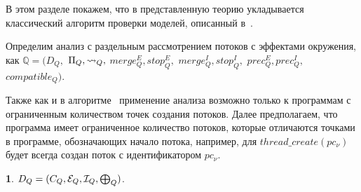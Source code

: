 В этом разделе покажем, что в представленную теорию укладывается классический алгоритм проверки моделей, описанный в~\cite{ThreadModular03}.

Определим анализ с раздельным рассмотрением потоков с эффектами окружения, как
$\mathbb{Q}=(D_{Q},$ $\Pi_{Q}, \leadsto_{Q},$ $merge^E_{Q}, stop^E_{Q},$ $merge^I_{Q}, stop^I_{Q},$ $prec^E_{Q},prec^I_{Q},$ $compatible_{Q})$.

Также как и в алгоритме~\cite{ThreadModular03} применение анализа возможно только к программам с ограниченным количеством точек создания потоков. Далее предполагаем, что программа имеет ограниченное количество потоков, которые отличаются точками в программе, обозначающих начало потока, например, для $thread\_create(pc_\nu)$ будет всегда создан поток с идентификатором $pc_\nu$.

{\textbf 1.} 
$D_Q=(C_Q, \mathcal{E}_Q,\mathcal{I}_Q, \mathrel{\bigoplus}_Q)$.\\

